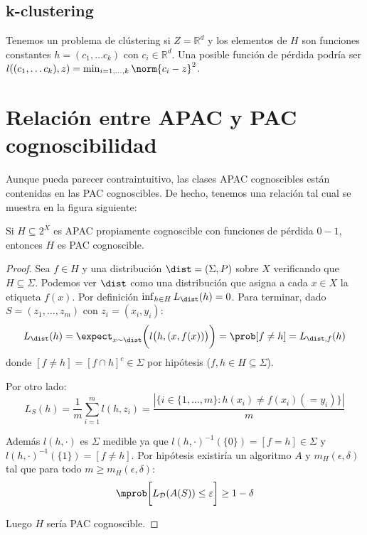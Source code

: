 \subsection{k-clustering}
Tenemos un problema de clústering si $Z=\mathbb{R}^d$ y los elementos de $H$ son funciones constantes 
$h = (c_1, \ldots c_k)$ con $c_i \in \mathbb{R}^d$. Una posible función de pérdida podría ser 
$l((c_1, \ldots c_k), z) = \min_{i=1,\ldots, k} \norm{c_i - z}^2$.


\section{Relación entre APAC y PAC cognoscibilidad}
Aunque pueda parecer contraintuitivo, las clases APAC cognoscibles están contenidas en las PAC cognoscibles. De hecho, 
tenemos una relación tal cual se muestra en la figura siguiente:


\begin{fact}
 Si $H\subseteq 2^X$ es APAC propiamente cognoscible con funciones de pérdida $0-1$, entonces $H$ es PAC cognoscible.
 \label{fact:rel-pac-apac}
\end{fact}

  \begin{proof}
   Sea $f\in H$ y una distribución $\dist=(\Sigma,P)$ sobre $X$ verificando que $H\subseteq \Sigma$. Podemos ver 
   $\dist$ como una distribución que asigna a cada $x\in X$ la etiqueta $f(x)$. Por definición $\inf_{h\in H} L_{\dist}(h) = 0$. 
   Para terminar, dado $S=(z_1, \ldots, z_m)$ con $z_i = (x_i,y_i)$:
   \[
     L_{\dist}(h) = \expect_{x\sim \dist}\bigg(l \big(h,(x,f(x)) \big)\bigg) = \prob[f \neq h] = L_{\dist,f}(h)
   \]
   donde $[f\neq h] = [f\cap h]^c \in \Sigma$ por hipótesis ($f,h\in H \subseteq \Sigma$).
   
   Por otro lado:
   \[
     L_{S}(h) = \frac{1}{m} \sum_{i=1}^m l(h,z_i) = \frac{|\{i\in\{1,\ldots, m\}: h(x_i) \neq f(x_i)(= y_i)\}|}{m}
   \]
   
   Además $l(h,\cdot)$ es $\Sigma$ medible ya que $l(h, \cdot)^{-1}(\{0\}) = [f = h] \in \Sigma$ y 
   $l(h, \cdot)^{-1}(\{1\}) = [f\neq h]$. Por hipótesis existiría un algoritmo $A$ y $m_H(\epsilon, \delta)$
   tal que para todo $m\ge m_H(\epsilon, \delta)$:
   \[
     \mprob \bigg[L_{\mathcal{D}}(A(S)) \le \varepsilon \bigg] \ge 1-\delta
   \]
   
   Luego $H$ sería PAC cognoscible.
  \end{proof}